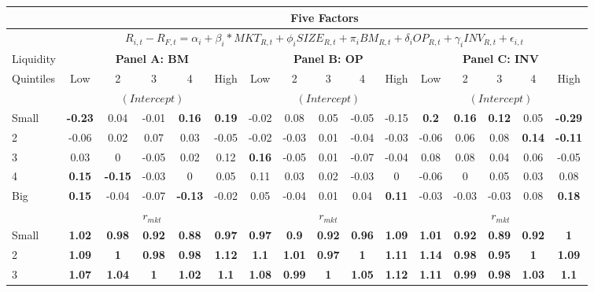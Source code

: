 \begin{table}[H]
\tiny
\centering
\begin{tabular}{lccccc|ccccc|ccccc}
\hline
& \multicolumn{15}{c}{Five Factors} \\ \hline
& \multicolumn{15}{c}{\tiny $R_{i,t} - R_{F,t} = \alpha_i+\beta_i*MKT_{R,t} + \phi_iSIZE_{R,t}+\pi_iBM_{R,t} + \delta_iOP_{R,t}+\gamma_iINV_{R,t} + \epsilon_{i,t}$} \\ \hline
Liquidity & \multicolumn{5}{c|}{\textbf{Panel A: BM}} & \multicolumn{5}{c|}{\textbf{Panel B: OP}} & \multicolumn{5}{c}{\textbf{Panel C: INV}} \\
Quintiles & Low & 2 & 3 & 4 & High & Low & 2 & 3 & 4 & High & Low & 2 & 3 & 4 & High \\  \hline
 & \multicolumn{5}{c|}{$(Intercept)$} & \multicolumn{5}{c|}{$(Intercept)$} & \multicolumn{5}{c}{$(Intercept)$} \\
Small & \textbf{-0.23} & 0.04 & -0.01 & \textbf{0.16} & \textbf{0.19} & -0.02 & 0.08 & 0.05 & -0.05 & -0.15 & \textbf{0.2} & \textbf{0.16} & \textbf{0.12} & 0.05 & \textbf{-0.29} \\
2 & -0.06 & 0.02 & 0.07 & 0.03 & -0.05 & -0.02 & -0.03 & 0.01 & -0.04 & -0.03 & -0.06 & 0.06 & 0.08 & \textbf{0.14} & \textbf{-0.11} \\
3 & 0.03 & 0 & -0.05 & 0.02 & 0.12 & \textbf{0.16} & -0.05 & 0.01 & -0.07 & -0.04 & 0.08 & 0.08 & 0.04 & 0.06 & -0.05 \\
4 & \textbf{0.15} & \textbf{-0.15} & -0.03 & 0 & 0.05 & 0.11 & 0.03 & 0.02 & -0.03 & 0 & -0.06 & 0 & 0.05 & 0.03 & 0.08 \\
Big & \textbf{0.15} & -0.04 & -0.07 & \textbf{-0.13} & -0.02 & 0.05 & -0.04 & 0.01 & 0.04 & \textbf{0.11} & -0.03 & -0.03 & -0.03 & 0.08 & \textbf{0.18} \\
 & \multicolumn{5}{c|}{$r_{mkt}$} & \multicolumn{5}{c|}{$r_{mkt}$} & \multicolumn{5}{c}{$r_{mkt}$} \\
Small & \textbf{1.02} & \textbf{0.98} & \textbf{0.92} & \textbf{0.88} & \textbf{0.97} & \textbf{0.97} & \textbf{0.9} & \textbf{0.92} & \textbf{0.96} & \textbf{1.09} & \textbf{1.01} & \textbf{0.92} & \textbf{0.89} & \textbf{0.92} & \textbf{1} \\
2 & \textbf{1.09} & \textbf{1} & \textbf{0.98} & \textbf{0.98} & \textbf{1.12} & \textbf{1.1} & \textbf{1.01} & \textbf{0.97} & \textbf{1} & \textbf{1.11} & \textbf{1.14} & \textbf{0.98} & \textbf{0.95} & \textbf{1} & \textbf{1.09} \\
3 & \textbf{1.07} & \textbf{1.04} & \textbf{1} & \textbf{1.02} & \textbf{1.1} & \textbf{1.08} & \textbf{0.99} & \textbf{1} & \textbf{1.05} & \textbf{1.12} & \textbf{1.11} & \textbf{0.99} & \textbf{0.98} & \textbf{1.03} & \textbf{1.1} \\

\end{tabular}
\end{table}
